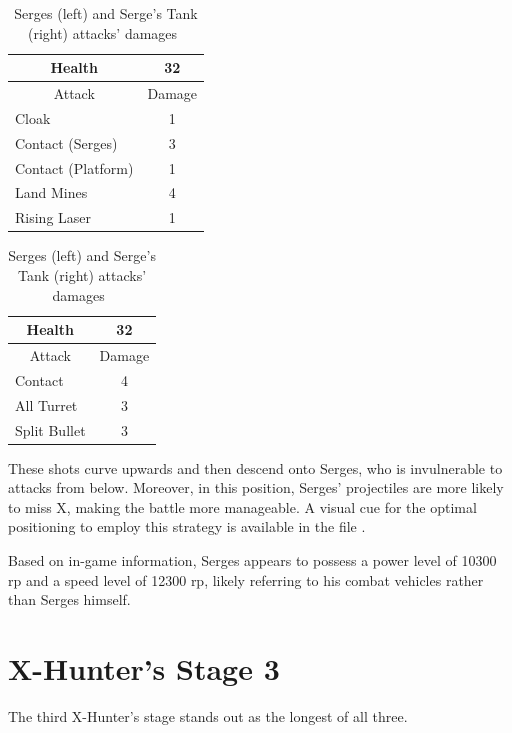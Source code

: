 \begin{table}[htp]
	\centering
	\begin{minipage}{.45\linewidth}
		\centering
		\begin{tabular}[h]{l c }
			\toprule
			\multicolumn{1}{c}{Health}  & 32 \\
			\midrule
			\multicolumn{1}{c}{Attack} & \multicolumn{1}{c}{Damage}\\
			Cloak & 1 \\
			Contact (Serges)& 3\\
			Contact (Platform)& 1\\
			Land Mines & 4\\
			Rising Laser& 1\\
			\bottomrule
		\end{tabular}
	\end{minipage}
	\begin{minipage}{.45\linewidth}
		\centering
		\begin{tabular}[h]{l c }
			\toprule
			\multicolumn{1}{c}{Health}  & 32 \\
			\midrule
			\multicolumn{1}{c}{Attack} & \multicolumn{1}{c}{Damage}\\
			Contact & 4 \\
			All Turret & 3\\
			Split Bullet & 3\\
			\bottomrule
		\end{tabular}
	\end{minipage}
	\caption{Serges (left) and Serge's Tank (right) attacks' damages~\cite{wiki:Serges}}
\end{table}
 These shots curve upwards and then descend onto Serges, who is invulnerable to attacks from below. Moreover, in this position, Serges' projectiles are more likely to miss X, making the battle more manageable. A visual cue for the optimal positioning to employ this strategy is available in the file .

Based on in-game information, Serges appears to possess a power level of 10300 rp and a speed level of 12300 rp, likely referring to his combat vehicles rather than Serges himself.



\section{X-Hunter's Stage 3}
The third X-Hunter's stage stands out as the longest of all three.

